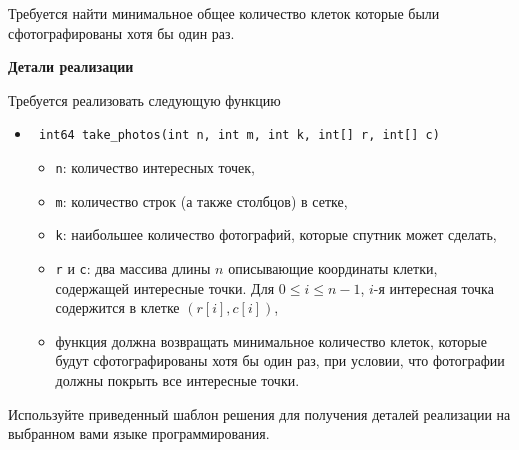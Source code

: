 Требуется найти минимальное общее количество клеток которые были
сфотографированы хотя бы один раз.

\textbf{Детали реализации}

Требуется реализовать следующую функцию

\begin{itemize}
\item \texttt{ int64 take\_photos(int n, int m, int k, int[] r, int[] c) }
\begin{itemize}

\item \texttt{n}: количество интересных точек,
\item \texttt{m}: количество строк (а также столбцов) в сетке,
\item \texttt{k}: наибольшее количество фотографий, которые спутник может сделать,
\item \texttt{r} и \texttt{c}: два массива длины $n$ описывающие координаты клетки, содержащей интересные точки. Для $0 \le i \le n - 1$, $i$-я интересная точка содержится в клетке $(r[i], c[i])$,
\item функция должна возвращать минимальное количество клеток, которые будут сфотографированы хотя бы один раз, при условии, что фотографии должны покрыть все интересные точки.
\end{itemize}
\end{itemize}

Используйте приведенный шаблон решения для получения деталей реализации на выбранном вами языке программирования.
